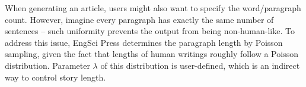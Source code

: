 \documentclass[../main.tex]{subfiles}
\begin{document}
When generating an article, users might also want to specify the word/paragraph count. However, imagine every paragraph has exactly the same number of sentences -- such uniformity prevents the output from being non-human-like. To address this issue, EngSci Press determines the paragraph length by Poisson sampling, given the fact that lengths of human writings roughly follow a Poisson distribution. Parameter $\lambda$ of this distribution is user-defined, which is an indirect way to control story length.
\end{document}
